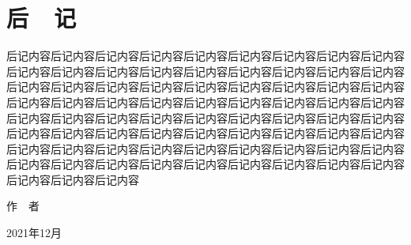 \documentclass[UTF8,openany,twoside,12pt]{book}
\theoremstyle{plain}
\begin{document}
%






%
%
%
%
%




\clearpage
\renewcommand\indexname{索~~引}
{}
\printindex




\chapter{后~~记}

后记内容后记内容后记内容后记内容后记内容后记内容后记内容后记内容后记内容后记内容后记内容后记内容后记内容后记内容后记内容后记内容后记内容后记内容后记内容后记内容后记内容后记内容后记内容后记内容后记内容后记内容后记内容后记内容后记内容后记内容后记内容后记内容后记内容后记内容后记内容后记内容后记内容后记内容后记内容后记内容后记内容后记内容后记内容后记内容后记内容后记内容后记内容后记内容后记内容后记内容后记内容后记内容后记内容后记内容后记内容后记内容后记内容后记内容后记内容后记内容后记内容后记内容后记内容后记内容后记内容后记内容后记内容后记内容后记内容后记内容后记内容后记内容后记内容后记内容后记内容


\vspace{5ex}
\begin{flushright}
作~~者~~~~~~~~~

2021年12月~~~~~
\end{flushright}
\end{document}
